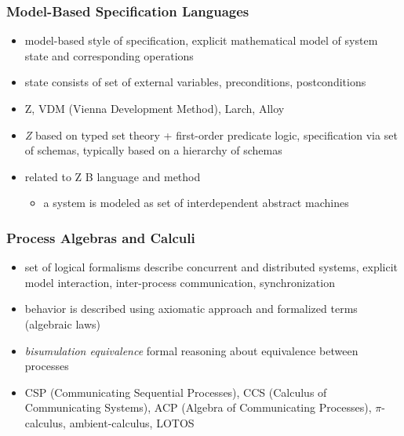 \documentclass[a4paper, 10pt]{article}
\begin{document}
\subsubsection*{Model-Based Specification Languages}
\begin{itemize}
    \item model-based style of specification, explicit mathematical model of system state and corresponding operations
    \item state consists of set of external variables, preconditions, postconditions
    \item Z, VDM (Vienna Development Method), Larch, Alloy
    \item \emph{Z} based on typed set theory + first-order predicate logic, specification via set of schemas, typically based on a hierarchy of schemas
    \item related to Z \follows B language and method
    \begin{itemize}
        \item a system is modeled as set of interdependent abstract machines
    \end{itemize}
\end{itemize}

\subsubsection*{Process Algebras and Calculi}
\begin{itemize}
    \item set of logical formalisms \follows describe concurrent and distributed systems, explicit model interaction, inter-process communication, synchronization
    \item behavior is described using axiomatic approach and formalized terms (algebraic laws)
    \item \emph{bisumulation equivalence} \follows formal reasoning about equivalence between processes
    \item CSP (Communicating Sequential Processes), CCS (Calculus of Communicating Systems), ACP (Algebra of Communicating Processes), $\pi$-calculus, ambient-calculus, LOTOS
\end{itemize}
\end{document}
